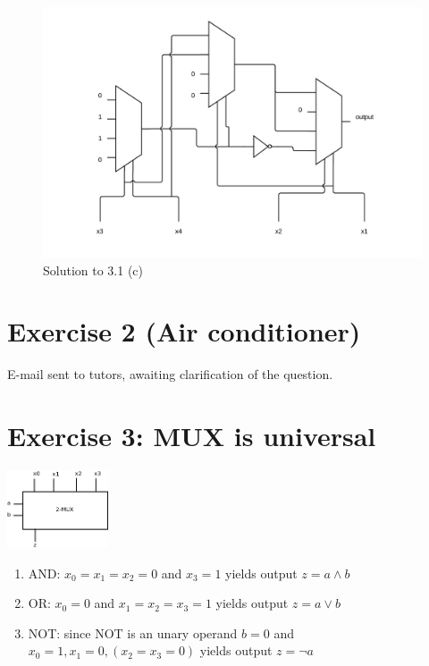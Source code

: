 \documentclass[10pt,a4paper]{scrartcl}
\begin{document}
\vspace{1em}
\begin{figure}[h]
  \centering\includegraphics[width=\linewidth]{images/exercise_3_1_c.png}
  \caption{Solution to 3.1 (c)}
\end{figure}
\vspace{1em}

\FloatBarrier
\section*{Exercise 2 (Air conditioner)}
E-mail sent to tutors, awaiting clarification of the question.

\section*{Exercise 3: MUX is universal}

\includegraphics[width=3cm]{images/3-3.png}
\begin{enumerate}
 \item AND: $x_0=x_1=x_2=0$ and $x_3 = 1$ yields output $z = a \land b$
 \item OR: $x_0 = 0$ and $x_1=x_2=x_3= 1$ yields output $z = a \lor b$
 \item NOT: since NOT is an unary operand $b=0$ and $x_0=1, x_1=0, (x_2=x_3=0)$ yields output $z = \lnot a$
\end{enumerate}
\end{document}
